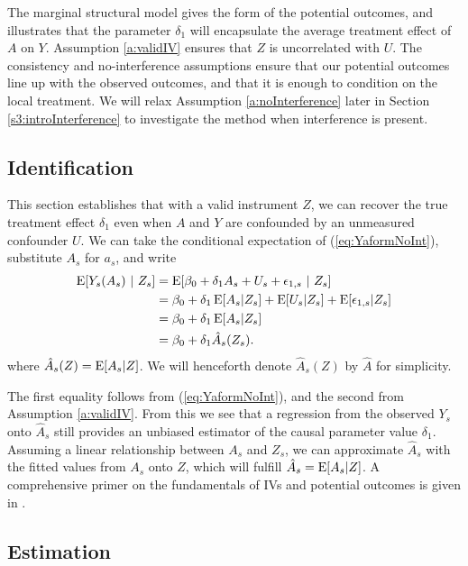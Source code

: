 \documentclass[12pt]{article}
\begin{document}
The marginal structural model gives the form of the potential outcomes, and illustrates that the parameter $\delta_1$ will encapsulate the average treatment effect of $A$ on $Y$. Assumption \ref{a:validIV} ensures that $Z$ is uncorrelated with $U$. The consistency and no-interference assumptions ensure that our potential outcomes line up with the observed outcomes, and that it is enough to condition on the local treatment. We will relax Assumption \ref{a:noInterference} later in Section \ref{s3:introInterference} to investigate the method when interference is present.



\subsection{Identification}

This section establishes that with a valid instrument $Z$, we can recover the true treatment effect $\delta_1$ even when $A$ and $Y$ are confounded by an unmeasured confounder $U$. 
We can take the conditional expectation of (\ref{eq:YaformNoInt}), substitute $A_s$ for $a_s$, and write
\begin{align*}
\operatorname{E} [ Y_s(A_s) ~|~ Z_s] 
&= \operatorname{E} [ \beta_0 + \delta_1 A_s + U_s + \epsilon_{1,s} ~|~ Z_s ] \\
&= \beta_0 + \delta_1 \operatorname{E} [A_s|Z_s] + \operatorname{E} [U_s|Z_s] + \operatorname{E}[\epsilon_{1,s} | Z_s] \\
&=  \beta_0 + \delta_1 \operatorname{E} [A_s|Z_s]  \\
&=  \beta_0 + \delta_1 \hat{A}_s(Z_s).
\end{align*}
where $\hat{A}_s(Z) = \operatorname{E} [ A_s | Z]$. We will henceforth denote $\hat{A}_s(Z)$ by $\hat{A}$ for simplicity.



The first equality follows from (\ref{eq:YaformNoInt}), and the second from Assumption \ref{a:validIV}. From this we see that a regression from the observed $Y_s$ onto $\hat{A}_s$ still provides an unbiased estimator of the causal parameter value $\delta_1$. Assuming a linear relationship between $A_s$ and $Z_s$, we can approximate $\hat{A}_s$ with the fitted values from $A_s$ onto $Z$, which will fulfill $\hat{A}_s = \operatorname{E} [A_s|Z]$. A comprehensive primer on the fundamentals of IVs and potential outcomes is given in  \cite{angrist1996identification}.



\subsection{Estimation}\label{ss3:estimation}
\end{document}
